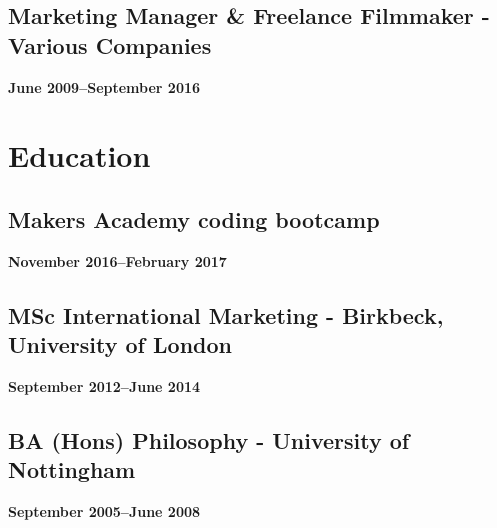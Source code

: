 \documentclass[a4paper]{scrartcl}
\begin{document}
\subsection*{Marketing Manager \& Freelance Filmmaker - Various Companies}
\textbf{June 2009--September 2016}

\section*{Education}

\subsection*{Makers Academy coding bootcamp}
\textbf{November 2016--February 2017}

\subsection*{MSc International Marketing - Birkbeck, University of London}
\textbf{September 2012--June 2014}

\subsection*{BA (Hons) Philosophy - University of Nottingham}
\textbf{September 2005--June 2008}
\end{document}
